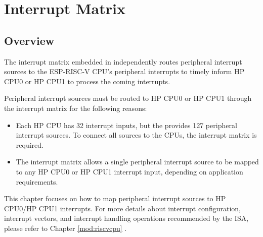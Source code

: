 \documentclass[main\_\_EN.tex]{subfiles}
\begin{document}

\ifglobal
\else
    \listoftodos
    {\let\clearpage\relax \listofdonetodos}
    \tableofcontents
\fi












\hypertarget{intmtrx}{}
\chapter{Interrupt Matrix}
\label{mod:intmtrx}

\section{Overview}

The interrupt matrix embedded in \chipname{} independently routes peripheral interrupt sources to the ESP-RISC-V CPU's peripheral interrupts to timely inform HP CPU0 or HP CPU1 to process the coming interrupts.

Peripheral interrupt sources must be routed to HP CPU0 or HP CPU1 through the interrupt matrix for the following reasons:
\begin{itemize}
    \item Each HP CPU has 32 interrupt inputs, but the \chipname{} provides 127 peripheral interrupt sources. To connect all sources to the CPUs, the interrupt matrix is required.
    \item The interrupt matrix allows a single peripheral interrupt source to be mapped to any HP CPU0 or HP CPU1 interrupt input, depending on application requirements.
\end{itemize}

\begin{tiplisting}
This chapter focuses on how to map peripheral interrupt sources to HP CPU0/HP CPU1 interrupts. For more details about interrupt configuration, interrupt vectors, and interrupt handling operations recommended by the ISA, please refer to Chapter \ref{mod:riscvcpu} \textit{}.
\end{tiplisting}
\vspace{-1em}
\end{document}
